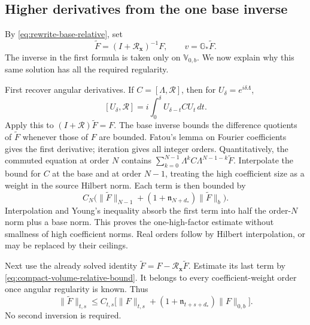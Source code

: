 \subsection{Higher derivatives from the one base inverse}

By \eqref{eq:rewrite-base-relative}, set
\[
 \widetilde F=(I+\mathscr R_{\mathbf x})^{-1}F,
 \qquad v=\mathbb G_*\widetilde F.
\]
The inverse in the first formula is taken only on $\mathbb V_{0,b}$.
We now explain why this same solution has all the required regularity.

First recover angular derivatives. If $C=[\Lambda,\mathscr R]$, then
for $U_\delta=e^{i\delta\Lambda}$,
\[
 [U_\delta,\mathscr R]
 =i\int_0^\delta U_{\delta-t}CU_t\,dt.
\]
Apply this to $(I+\mathscr R)\widetilde F=F$. The base inverse
bounds the difference quotients of $\widetilde F$ whenever those
of $F$ are bounded. Fatou's lemma on Fourier coefficients gives the
first derivative; iteration gives all integer orders. Quantitatively,
the commuted equation at order $N$ contains
$\sum_{k=0}^{N-1}\Lambda^kC\Lambda^{N-1-k}\widetilde F$.
Interpolate the bound for $C$ at the base and at order $N-1$, treating
the high coefficient size as a weight in the source Hilbert norm.
Each term is then bounded by
\[
 C_N\bigl(\|\widetilde F\|_{N-1}
 +(1+\mathfrak n_{N+d_*})\|\widetilde F\|_b\bigr).
\]
Interpolation and Young's inequality absorb the first term into
half the order-$N$ norm plus a base norm. This proves the one-high-factor
estimate without smallness of high coefficient norms. Real orders
follow by Hilbert interpolation, or may be replaced by their ceilings.

Next use the already solved identity
$\widetilde F=F-\mathscr R_{\mathbf x}\widetilde F$.
Estimate its last term by \eqref{eq:compact-volume-relative-bound}.
It belongs to every coefficient-weight order once angular regularity
is known. Thus
\begin{equation}\label{eq:full-source-tame-resolvent}
 \|\widetilde F\|_{t,s}
 \le C_{t,s}\bigl[\|F\|_{t,s}
       +(1+\mathfrak n_{t+s+d_*})\|F\|_{0,b}\bigr].
\end{equation}
No second inversion is required.

